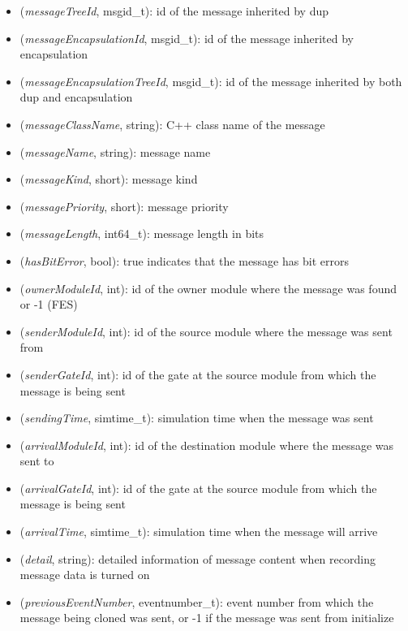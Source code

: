 \begin{itemize}
  \item {} (\textit{messageTreeId}, msgid\_t): id of the message inherited by dup
  \item {} (\textit{messageEncapsulationId}, msgid\_t): id of the message inherited by encapsulation
  \item {} (\textit{messageEncapsulationTreeId}, msgid\_t): id of the message inherited by both dup and encapsulation
  \item {} (\textit{messageClassName}, string): C++ class name of the message
  \item {} (\textit{messageName}, string): message name
  \item {} (\textit{messageKind}, short): message kind
  \item {} (\textit{messagePriority}, short): message priority
  \item {} (\textit{messageLength}, int64\_t): message length in bits
  \item {} (\textit{hasBitError}, bool): true indicates that the message has bit errors
  \item {} (\textit{ownerModuleId}, int): id of the owner module where the message was found or -1 (FES)
  \item {} (\textit{senderModuleId}, int): id of the source module where the message was sent from
  \item {} (\textit{senderGateId}, int): id of the gate at the source module from which the message is being sent
  \item {} (\textit{sendingTime}, simtime\_t): simulation time when the message was sent
  \item {} (\textit{arrivalModuleId}, int): id of the destination module where the message was sent to
  \item {} (\textit{arrivalGateId}, int): id of the gate at the source module from which the message is being sent
  \item {} (\textit{arrivalTime}, simtime\_t): simulation time when the message will arrive
  \item {} (\textit{detail}, string): detailed information of message content when recording message data is turned on
  \item {} (\textit{previousEventNumber}, eventnumber\_t): event number from which the message being cloned was sent, or -1 if the message was sent from initialize
\end{itemize}

